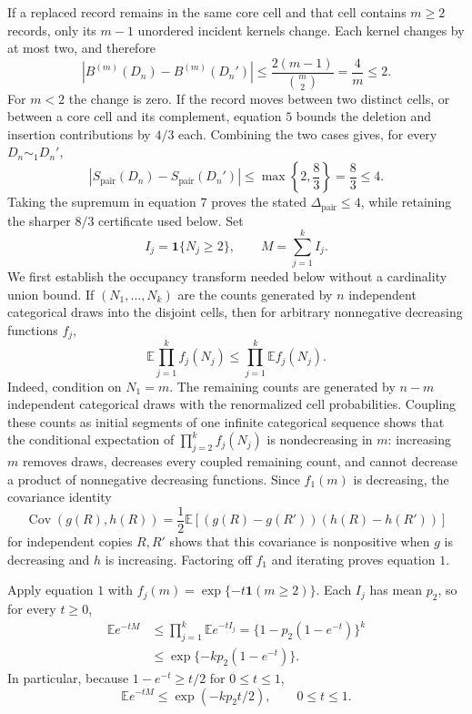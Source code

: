 If a replaced record remains in the same core cell and that cell contains \(m\ge2\) records, only its \(m-1\) unordered incident kernels change.  Each kernel changes by at most two, and therefore
\[
 |B^{(m)}(D_n)-B^{(m)}(D_n')|
 \le\frac{2(m-1)}{\binom m2}=\frac4m\le2. \tag{6}
\]
For \(m<2\) the change is zero.  If the record moves between two distinct cells, or between a core cell and its complement, equation \(5\) bounds the deletion and insertion contributions by \(4/3\) each.  Combining the two cases gives, for every \(D_n\sim_1D_n'\),
\[
 |S_{\mathrm{pair}}(D_n)-S_{\mathrm{pair}}(D_n')|
 \le\max\left\{2,\frac83\right\}=\frac83\le4. \tag{7}
\]
Taking the supremum in equation \(7\) proves the stated \(\Delta_{\mathrm{pair}}\le4\), while retaining the sharper \(8/3\) certificate used below.
Set
\[
 I_j=\mathbf 1\{N_j\ge2\},
 \qquad
 M=\sum_{j=1}^k I_j.
\]
We first establish the occupancy transform needed below without a cardinality union bound.  If \((N_1,\ldots,N_k)\) are the counts generated by \(n\) independent categorical draws into the disjoint cells, then for arbitrary nonnegative decreasing functions \(f_j\),
\[
 \mathbb E\prod_{j=1}^k f_j(N_j)
 \le\prod_{j=1}^k\mathbb E f_j(N_j). \tag{1}
\]
Indeed, condition on \(N_1=m\).  The remaining counts are generated by \(n-m\) independent categorical draws with the renormalized cell probabilities.  Coupling these counts as initial segments of one infinite categorical sequence shows that the conditional expectation of \(\prod_{j=2}^k f_j(N_j)\) is nondecreasing in \(m\): increasing \(m\) removes draws, decreases every coupled remaining count, and cannot decrease a product of nonnegative decreasing functions.  Since \(f_1(m)\) is decreasing, the covariance identity
\[
 \operatorname{Cov}(g(R),h(R))
 =\frac12\mathbb E[(g(R)-g(R'))(h(R)-h(R'))]
\]
for independent copies \(R,R'\) shows that this covariance is nonpositive when \(g\) is decreasing and \(h\) is increasing.  Factoring off \(f_1\) and iterating proves equation \(1\).

Apply equation \(1\) with \(f_j(m)=\exp\{-t\mathbf 1(m\ge2)\}\).  Each \(I_j\) has mean \(p_2\), so for every \(t\ge0\),
\[
 \begin{aligned}
 \mathbb E e^{-tM}
 &\le\prod_{j=1}^k\mathbb E e^{-tI_j}
 =\{1-p_2(1-e^{-t})\}^k\\
 &\le\exp\{-kp_2(1-e^{-t})\}. \tag{2}
 \end{aligned}
\]
In particular, because \(1-e^{-t}\ge t/2\) for \(0\le t\le1\),
\[
 \mathbb E e^{-tM}\le\exp(-kp_2t/2),
 \qquad 0\le t\le1. \tag{3}
\]

